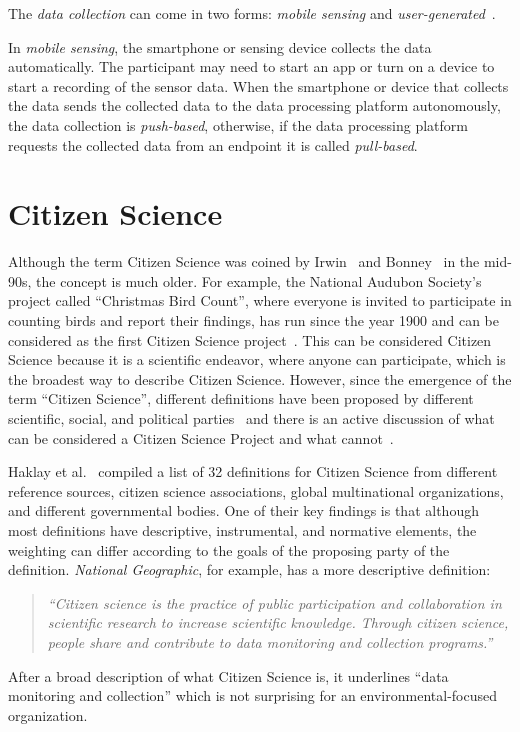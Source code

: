 The \textit{data collection} can come in two forms: \textit{mobile sensing} and \textit{user-generated}~\cite{pietschmann2008croco}.

In \textit{mobile sensing}, the smartphone or sensing device collects the data automatically.
The participant may need to start an app or turn on a device to start a recording of the sensor data.
When the smartphone or device that collects the data sends the collected data to the data processing platform autonomously, the data collection is \textit{push-based}, otherwise, if the data processing platform requests the collected data from an endpoint it is called \textit{pull-based}. 

\section{Citizen Science}
\label{sec:citizen_science_background}
Although the term Citizen Science was coined by Irwin~\cite{irwin2002citizen} and Bonney~\cite{bonney1996citizen} in the mid-90s, the concept is much older.
For example, the National Audubon Society's project called ``Christmas Bird Count'', where everyone is invited to participate in counting birds and report their findings, has run since the year 1900 and can be considered as the first Citizen Science project~\cite{silvertown2009new}.
This can be considered Citizen Science because it is a scientific endeavor, where anyone can participate, which is the broadest way to describe Citizen Science.
However, since the emergence of the term ``Citizen Science'', different definitions have been proposed by different scientific, social, and political parties~\cite{heigl2019toward,ecsa2015ten,us2016crowdsourcing} and there is an active discussion of what can be considered a Citizen Science Project and what cannot~\cite{haklay2021citizen}. 

Haklay et al.~\cite{haklay2021citizen} compiled a list of 32 definitions for Citizen Science from different reference sources, citizen science associations, global multinational organizations, and different governmental bodies.
One of their key findings is that although most definitions have descriptive, instrumental, and normative elements, the weighting can differ according to the goals of the proposing party of the definition.
\textit{National Geographic}, for example, has a more descriptive definition:
\begin{quotation}
\textit{``Citizen science is the practice of public participation and collaboration in scientific research to increase scientific knowledge. Through citizen science, people share and contribute to data monitoring and collection programs.''}~\cite{ullrich2024citizen}
\end{quotation}
After a broad description of what Citizen Science is, it underlines ``data monitoring and collection'' which is not surprising for an environmental-focused organization.

